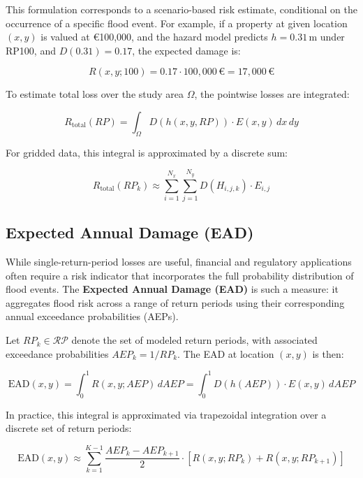 This formulation corresponds to a scenario-based risk estimate, conditional on the occurrence of a specific flood event. For example, if a property at given location \( (x, y) \) is valued at €100,000, and the hazard model predicts \( h = 0.31\, \mathrm{m} \) under RP100, and \( D(0.31) = 0.17 \), the expected damage is:

\[
R(x, y; 100) = 0.17 \cdot 100{,}000\, \text{€} = 17{,}000\, \text{€}
\]

To estimate total loss over the study area \( \Omega \), the pointwise losses are integrated:

\begin{equation}
	R_{\text{total}}(RP) = \int_{\Omega} D(h(x, y, RP)) \cdot E(x, y) \, dx \, dy
	\label{eq:total-risk}
\end{equation}

For gridded data, this integral is approximated by a discrete sum:

\begin{equation}
	R_{\text{total}}(RP_k) \approx \sum_{i=1}^{N_x} \sum_{j=1}^{N_y} D(H_{i,j,k}) \cdot E_{i,j}
	\label{eq:total-risk-discrete}
\end{equation}

\subsection{Expected Annual Damage (EAD)}

While single-return-period losses are useful, financial and regulatory applications often require a risk indicator that incorporates the full probability distribution of flood events. The \textbf{Expected Annual Damage (EAD)} is such a measure: it aggregates flood risk across a range of return periods using their corresponding annual exceedance probabilities (AEPs).

Let \( RP_k \in \mathcal{RP} \) denote the set of modeled return periods, with associated exceedance probabilities \( AEP_k = 1/RP_k \). The EAD at location \( (x, y) \) is then:

\begin{equation}
	\text{EAD}(x, y) = \int_0^1 R(x, y; AEP) \, dAEP = \int_0^1 D(h(AEP)) \cdot E(x, y) \, dAEP
	\label{eq:ead-definition}
\end{equation}

In practice, this integral is approximated via trapezoidal integration over a discrete set of return periods:

\[
\text{EAD}(x, y) \approx \sum_{k=1}^{K-1} \frac{AEP_k - AEP_{k+1}}{2} \cdot \left[ R(x, y; RP_k) + R(x, y; RP_{k+1}) \right]
\]


